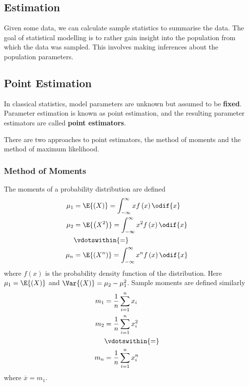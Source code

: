 \documentclass{article}
\begin{document}
\subsection{Estimation}
Given some data, we can calculate sample statistics to summarise the data.
The goal of statistical modelling is to rather gain insight into the population from which the data was sampled.
This involves making inferences about the population parameters.
\subsection{Point Estimation}
In classical statistics, model parameters are unknown but assumed to be \textbf{fixed}.
Parameter \linebreak estimation is known as point estimation,
and the resulting parameter estimators are called \textbf{point estimators}.

There are two approaches to point estimators, the method of moments and the method of maximum likelihood.
\subsubsection{Method of Moments}
The moments of a probability distribution are defined
\begin{align*}
    \mu_1 & = \E{\left( X \right)} = \int_{-\infty}^\infty x f\left( x \right) \odif{x}     \\
    \mu_2 & = \E{\left( X^2 \right)} = \int_{-\infty}^\infty x^2 f\left( x \right) \odif{x} \\
          & \vdotswithin{=}                                                                 \\
    \mu_n & = \E{\left( X^n \right)} = \int_{-\infty}^\infty x^n f\left( x \right) \odif{x}
\end{align*}
where \(f\left( x \right)\) is the probability density function of the distribution.
Here \(\mu_1 = \E{\left( X \right)}\) and \(\Var{\left( X \right)} = \mu_2 - \mu_1^2\).
Sample moments are defined similarly
\begin{align*}
    m_1 & = \frac{1}{n} \sum_{i = 1}^n x_i   \\
    m_2 & = \frac{1}{n} \sum_{i = 1}^n x_i^2 \\
        & \vdotswithin{=}                    \\
    m_n & = \frac{1}{n} \sum_{i = 1}^n x_i^n
\end{align*}
where \(\overline{x} = m_1\).
\end{document}
